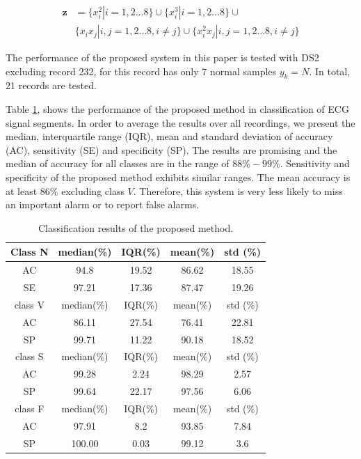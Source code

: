 \begin{align}
\label{eq:8-32}
\mathbf{z}&=\{x_i^2|i=1,2\dots 8\}\cup\{x_i^3|i=1,2\dots 8\} \cup\\
\nonumber
& \{x_ix_j|i,j=1,2\dots 8,i\neq j\} \cup  \{  x_i^2x_j | i,j=1,2\dots 8,i\neq j \}
\end{align}

The performance of the proposed system in this paper is tested with DS2 excluding record 232, for this record has only 7 normal samples $y_k=N$. In total, 21 records are tested.

Table \ref{table:result1}, shows the performance of the proposed method in classification of ECG signal segments. In order to average the results over all recordings, we present the median, interquartile range (IQR), mean and standard deviation of accuracy (AC), sensitivity (SE) and specificity (SP). The results are promising and the median of accuracy for all classes are in the range of $88\%-99\%$. Sensitivity and specificity of the proposed method exhibits similar ranges. The mean accuracy is at least $86\%$ excluding class $V$. Therefore, this system is very less likely to miss an important alarm or to report false alarms. 

\begin{table}[thpb]
	\caption{Classification results of the proposed method.}
	\centering
	\begin{tabular}{|c||c||c||c||c|}
		\hline
		Class N & median(\%) & IQR(\%) & mean(\%)& std (\%) \\ 
		\hline 
		AC & 94.8& 19.52 & 86.62 & 18.55\\ 
		\hline 
		SE & 97.21  & 17.36 & 87.47 &19.26 \\ 
		\hline 
		class V & median(\%) & IQR(\%) & mean(\%)& std (\%) \\ 
		\hline 
		AC & 86.11 & 27.54 & 76.41 & 22.81 \\ 
		\hline 
		SP & 99.71 & 11.22 & 90.18 & 18.52 \\ 
		\hline 
		class S & median(\%) & IQR(\%) & mean(\%)& std (\%)\\ 
		\hline 
		AC & 99.28 & 2.24& 98.29&2.57 \\ 
		\hline 
		SP & 99.64& 22.17& 97.56 & 6.06\\ 
		\hline 
		class F & median(\%) & IQR(\%) & mean(\%)& std (\%) \\ 
		\hline 
		AC & 97.91 & 8.2&93.85&7.84\\ 
		\hline 
		SP & 100.00 & 0.03&99.12&3.6\\ 
		\hline 
		\hline
	\end{tabular} 
	\label{table:result1}
\end{table}

